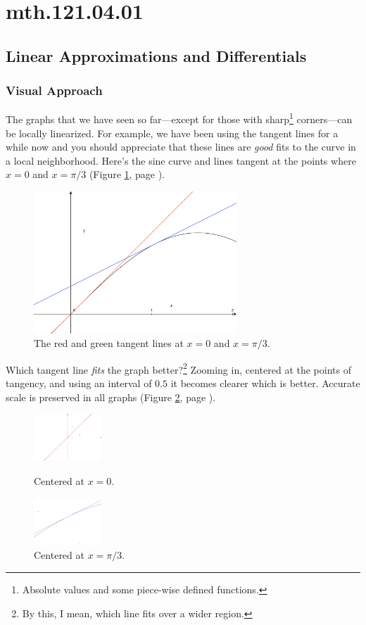 \documentclass[12pt,addpoints, answers, fleqn]{exam}
\begin{document}
\section{mth.121.04.01}
\subsection{Linear Approximations and Differentials}
\subsubsection{Visual Approach}
The graphs that we have seen so far---except for those with sharp\footnote{Absolute values and some piece-wise defined functions.} corners---can be locally linearized. For example, we have been using the tangent lines for a while now and you should appreciate that these lines are \emph{good} fits to the curve in a local neighborhood. Here's the sine curve and lines tangent at the points where $x=0$ and $x= \pi / 3$ (Figure \ref{fig:graph2001}, page \pageref{fig:graph2001}).
\begin{figure}[htbp] %
   \centering
   \includegraphics[width=3in]{./graphics/graph2001.pdf} 
   \caption{The red and green tangent lines at $x=0$ and $x= \pi / 3$.}
   \label{fig:graph2001}
\end{figure}

Which tangent line \emph{fits} the graph better?\footnote{By this, I mean, which line fits over a wider region.} Zooming in, centered at the points of tangency, and using an interval of $0.5$ it becomes clearer which is better. Accurate scale is preserved in all graphs (Figure \ref{fig:graph200302}, page \pageref{fig:graph200302}).

\begin{figure}[htbp] %
   \centering
   \includegraphics[width=1in]{./graphics/graph2002.pdf} 
   \caption{Centered at $x=0$.}
    \includegraphics[width=1in]{./graphics/graph2003.pdf} 
   \caption{Centered at $x= \pi / 3$.}
   \label{fig:graph200302}
\end{figure}
\end{document}
